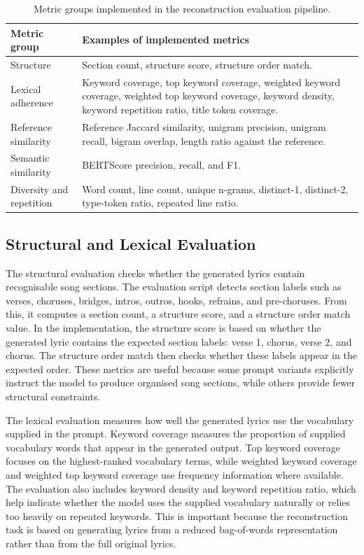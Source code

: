 \begin{table}[H]
\centering
\renewcommand{\arraystretch}{1.2}
\caption{Metric groups implemented in the reconstruction evaluation pipeline.}
\label{tab:evaluation_metric_groups}
\begin{tabular}{
>{\raggedright\arraybackslash}p{}
>{\raggedright\arraybackslash}p{}
}
\hline
Metric group & Examples of implemented metrics \\
\hline
Structure & Section count, structure score, structure order match. \\
Lexical adherence & Keyword coverage, top keyword coverage, weighted keyword coverage, weighted top keyword coverage, keyword density, keyword repetition ratio, title token coverage. \\
Reference similarity & Reference Jaccard similarity, unigram precision, unigram recall, bigram overlap, length ratio against the reference. \\
Semantic similarity & BERTScore precision, recall, and F1. \\
Diversity and repetition & Word count, line count, unique n-grams, distinct-1, distinct-2, type-token ratio, repeated line ratio. \\
\hline
\end{tabular}
\renewcommand{\arraystretch}{1.0}
\end{table}

\subsection{Structural and Lexical Evaluation}

The structural evaluation checks whether the generated lyrics contain recognisable song sections. The evaluation script detects section labels such as verses, choruses, bridges, intros, outros, hooks, refrains, and pre-choruses. From this, it computes a section count, a structure score, and a structure order match value. In the implementation, the structure score is based on whether the generated lyric contains the expected section labels: verse 1, chorus, verse 2, and chorus. The structure order match then checks whether these labels appear in the expected order. These metrics are useful because some prompt variants explicitly instruct the model to produce organised song sections, while others provide fewer structural constraints.

The lexical evaluation measures how well the generated lyrics use the vocabulary supplied in the prompt. Keyword coverage measures the proportion of supplied vocabulary words that appear in the generated output. Top keyword coverage focuses on the highest-ranked vocabulary terms, while weighted keyword coverage and weighted top keyword coverage use frequency information where available. The evaluation also includes keyword density and keyword repetition ratio, which help indicate whether the model uses the supplied vocabulary naturally or relies too heavily on repeated keywords. This is important because the reconstruction task is based on generating lyrics from a reduced bag-of-words representation rather than from the full original lyrics.

